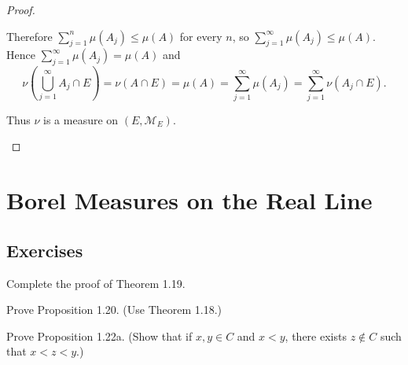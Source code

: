 \begin{proof}
\begin{enumerate}[itemsep=0pt,label={\textbf{\alph*.}}]
              Therefore \( \sum_{j=1}^{n} \mu(A_{j}) \le \mu(A) \) for every \( n \), so \( \sum_{j=1}^{\infty} \mu(A_{j}) \le \mu(A) \). Hence \( \sum_{j=1}^{\infty} \mu(A_{j}) = \mu(A) \) and
              \[
                  \nu\left( \bigcup_{j=1}^{\infty} A_{j} \cap E \right) = \nu(A \cap E) = \mu(A) = \sum_{j=1}^{\infty} \mu(A_{j}) = \sum_{j=1}^{\infty} \nu(A_{j} \cap E).
              \]

              Thus \( \nu \) is a measure on \( (E, \mathcal{M}_{E}) \). \qedhere
    \end{enumerate}
\end{proof}

\newpage

\section{Borel Measures on the Real Line}

\subsection*{Exercises}

\begin{exercise}
    Complete the proof of Theorem 1.19.
\end{exercise}

\begin{exercise}
    Prove Proposition 1.20. (Use Theorem 1.18.)
\end{exercise}

\begin{exercise}
    Prove Proposition 1.22a. (Show that if \( x, y \in C \) and \( x < y \), there exists \( z \notin C \) such that \( x < z < y \).)
\end{exercise}

